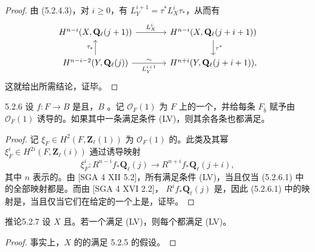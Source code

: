 \begin{proof}
由 (5.2.4.3)，对 $i\geq0$，有 $L_Y^{i+1}=\tau^*L_X^i\tau_*$，从而有
\[
\begin{tikzcd}[column sep=large]
H^{n-i}(X,\mathbf Q_\ell(j+1))\arrow[r,"L_X^i"]&H^{n-i}(X,\mathbf Q_\ell(j+i+1))\arrow[d,"\tau^*"]\\
H^{n-i-2}(Y,\mathbf Q_\ell(j))\arrow[u,"\tau_*"]\arrow[r,"L_Y^{i+1}"',"\sim"]&H^{n+i}(Y,\mathbf Q_\ell(j+i+1)),
\end{tikzcd}
\]
这就给出所需结论，证毕。
\end{proof}
\begin{SGAresult}{}{5.2.6}
设 $f:F\to B$ 是且，$B$ 。记 $\mathscr O_F(1)$ 为 $F$ 上的一个，并给每条 $F_{\bar b}$ 赋予由 $\mathscr O_F(1)$ 诱导的。如果其中一条满足条件 (LV)，则其余各条也都满足。
\end{SGAresult}
\begin{proof}
记 $\xi_F\in H^2(F,\mathbf Z_\ell(1))$ 为 $\mathscr O_F(1)$ 的。此类及其幂 $\xi_F^i\in H^{2i}(F,\mathbf Z_\ell(i))$ 通过诱导映射
\begin{equation}\tag{5.2.6.1}\xi_F^i:R^{n-i}f_*\mathbf Q_\ell(j)\longrightarrow R^{n+i}f_*\mathbf Q_\ell(j+i),\end{equation}
其中 $n$ 表示的。由 [SGA 4 XII 5.2]，所有满足条件 (LV)，当且仅当 (5.2.6.1) 中的全部映射都是。而由 [SGA 4 XVI 2.2]， $R^if_*\mathbf Q_\ell(j)$ 是，因此 (5.2.6.1) 中的映射是，当且仅当它们在给定的一个上是，证毕。
\end{proof}
\begin{SGAresult}{推论}{5.2.7}
设 $X$ 且。若一个满足 (LV)，则每个都满足 (LV)。
\end{SGAresult}
\begin{proof}
事实上，$X$ 的的满足 5.2.5 的假设。
\end{proof}
